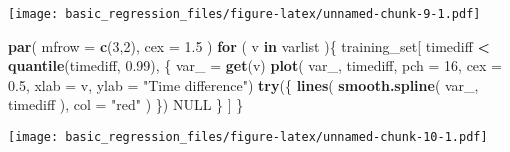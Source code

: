 \documentclass[]{article}
\newenvironment{Shaded}{\begin{snugshade}}{\end{snugshade}}
\newcommand{\ControlFlowTok}[1]{\textcolor[rgb]{0.13,0.29,0.53}{\textbf{#1}}}
\newcommand{\DataTypeTok}[1]{\textcolor[rgb]{0.13,0.29,0.53}{#1}}
\newcommand{\DecValTok}[1]{\textcolor[rgb]{0.00,0.00,0.81}{#1}}
\newcommand{\FloatTok}[1]{\textcolor[rgb]{0.00,0.00,0.81}{#1}}
\newcommand{\KeywordTok}[1]{\textcolor[rgb]{0.13,0.29,0.53}{\textbf{#1}}}
\newcommand{\NormalTok}[1]{#1}
\newcommand{\OperatorTok}[1]{\textcolor[rgb]{0.81,0.36,0.00}{\textbf{#1}}}
\newcommand{\OtherTok}[1]{\textcolor[rgb]{0.56,0.35,0.01}{#1}}
\newcommand{\StringTok}[1]{\textcolor[rgb]{0.31,0.60,0.02}{#1}}
\begin{document}
\begin{Shaded}
\end{Shaded}

\texttt{[image: basic\_regression\_files/figure-latex/unnamed-chunk-9-1.pdf]}

\begin{Shaded}
\begin{Highlighting}[]
\KeywordTok{par}\NormalTok{( }\DataTypeTok{mfrow =} \KeywordTok{c}\NormalTok{(}\DecValTok{3}\NormalTok{,}\DecValTok{2}\NormalTok{), }\DataTypeTok{cex =} \FloatTok{1.5}\NormalTok{ )}
\ControlFlowTok{for}\NormalTok{ ( v }\ControlFlowTok{in}\NormalTok{ varlist )\{}
\NormalTok{    training_set[ timediff }\OperatorTok{<}\StringTok{ }\KeywordTok{quantile}\NormalTok{(timediff, }\FloatTok{0.99}\NormalTok{), \{}
\NormalTok{        var_ =}\StringTok{ }\KeywordTok{get}\NormalTok{(v)}
        \KeywordTok{plot}\NormalTok{( var_, timediff, }
            \DataTypeTok{pch =} \DecValTok{16}\NormalTok{, }\DataTypeTok{cex =} \FloatTok{0.5}\NormalTok{,}
            \DataTypeTok{xlab =}\NormalTok{ v, }\DataTypeTok{ylab =} \StringTok{"Time difference"}\NormalTok{)}
        \KeywordTok{try}\NormalTok{(\{}
            \KeywordTok{lines}\NormalTok{( }\KeywordTok{smooth.spline}\NormalTok{( var_, }
\NormalTok{                timediff ), }\DataTypeTok{col =} \StringTok{"red"}\NormalTok{ )}
\NormalTok{        \})}
        \OtherTok{NULL}
\NormalTok{    \} ]}
\NormalTok{\}}
\end{Highlighting}
\end{Shaded}

\texttt{[image: basic\_regression\_files/figure-latex/unnamed-chunk-10-1.pdf]}
\end{document}
